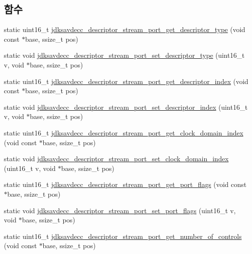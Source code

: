 \subsection*{함수}
\begin{DoxyCompactItemize}
\item 
static uint16\+\_\+t \hyperlink{group__descriptor__stream__port_ga9e5c5bfcfc4ac7f6ed5fbc306ae64397}{jdksavdecc\+\_\+descriptor\+\_\+stream\+\_\+port\+\_\+get\+\_\+descriptor\+\_\+type} (void const $\ast$base, ssize\+\_\+t pos)
\item 
static void \hyperlink{group__descriptor__stream__port_gade217c4ccbb178f0c8c3e585c905e6ee}{jdksavdecc\+\_\+descriptor\+\_\+stream\+\_\+port\+\_\+set\+\_\+descriptor\+\_\+type} (uint16\+\_\+t v, void $\ast$base, ssize\+\_\+t pos)
\item 
static uint16\+\_\+t \hyperlink{group__descriptor__stream__port_ga7676ebd6ce26b6ef2d09bb93007f7c53}{jdksavdecc\+\_\+descriptor\+\_\+stream\+\_\+port\+\_\+get\+\_\+descriptor\+\_\+index} (void const $\ast$base, ssize\+\_\+t pos)
\item 
static void \hyperlink{group__descriptor__stream__port_gaea8ba85a6935bce53a5ff07e80b791df}{jdksavdecc\+\_\+descriptor\+\_\+stream\+\_\+port\+\_\+set\+\_\+descriptor\+\_\+index} (uint16\+\_\+t v, void $\ast$base, ssize\+\_\+t pos)
\item 
static uint16\+\_\+t \hyperlink{group__descriptor__stream__port_gaaf86a219e03309d42d2037bc17edd4bf}{jdksavdecc\+\_\+descriptor\+\_\+stream\+\_\+port\+\_\+get\+\_\+clock\+\_\+domain\+\_\+index} (void const $\ast$base, ssize\+\_\+t pos)
\item 
static void \hyperlink{group__descriptor__stream__port_ga659743d80bd5791634f294b4b6e9d2fa}{jdksavdecc\+\_\+descriptor\+\_\+stream\+\_\+port\+\_\+set\+\_\+clock\+\_\+domain\+\_\+index} (uint16\+\_\+t v, void $\ast$base, ssize\+\_\+t pos)
\item 
static uint16\+\_\+t \hyperlink{group__descriptor__stream__port_ga95f34b2f9da40d90ee1b5b7fcda8403f}{jdksavdecc\+\_\+descriptor\+\_\+stream\+\_\+port\+\_\+get\+\_\+port\+\_\+flags} (void const $\ast$base, ssize\+\_\+t pos)
\item 
static void \hyperlink{group__descriptor__stream__port_ga3b8b89a65df17ad7ee9a206b372dd767}{jdksavdecc\+\_\+descriptor\+\_\+stream\+\_\+port\+\_\+set\+\_\+port\+\_\+flags} (uint16\+\_\+t v, void $\ast$base, ssize\+\_\+t pos)
\item 
static uint16\+\_\+t \hyperlink{group__descriptor__stream__port_ga125ba5e5a6d39ff2552d9289f5c44839}{jdksavdecc\+\_\+descriptor\+\_\+stream\+\_\+port\+\_\+get\+\_\+number\+\_\+of\+\_\+controls} (void const $\ast$base, ssize\+\_\+t pos)

\end{DoxyCompactItemize}
